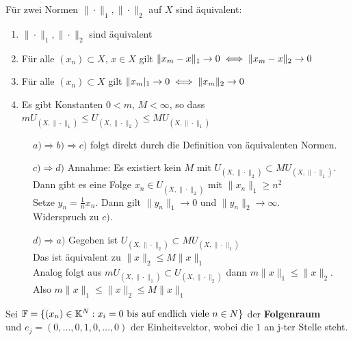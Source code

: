 \begin{prop}
	Für zwei Normen $\| \cdot \|_{1}, \| \cdot \|_{2}$ auf $X$ sind äquivalent:
	\begin{enumerate}[label=\alph*\upshape)]
		\item $\| \cdot \|_{1}, \| \cdot \|_{2}$ sind äquivalent
		\item Für alle $(x_{n}) \subset X$, $x \in X$ gilt $\| x_{m} - x \|_{1} \rightarrow 0 \iff \| x_{m} - x \|_{2} \rightarrow 0 $
		\item Für alle $(x_{n}) \subset X$ gilt $\| x_{m} |_{1} \rightarrow 0 \iff \| x_{m} \|_{2} \rightarrow 0 $
		\item Es gibt Konstanten $0 < m$, $M < \infty$, so dass $m U_{(X, \| \cdot \|_{1})} \leq U_{(X, \| \cdot \|_{2})} \leq M U_{(X, \| \cdot \|_{1})}$
	\end{enumerate}
	\begin{beweis}
		\begin{description}
			\item[] $a) \Rightarrow b) \Rightarrow c)$ folgt direkt durch die Definition von äquivalenten Normen. 
  			\item[] $c) \Rightarrow d)$ Annahme: Es existiert kein $M$ mit $U_{(X, \| \cdot \|_{2})} \subset M U_{(X, \| \cdot \|_{1})}$. \\
  				Dann gibt es eine Folge $x_{n} \in U_{(X, \| \cdot \|_{2})}$ mit $\| x_{n} \|_{1} \geq n^{2}$ \\
  				Setze $y_{n} =  \frac{1}{n} x_{n}$. Dann gilt $\| y_{n} \|_{1} \rightarrow 0$ und $\| y_{n} \|_{2} \rightarrow \infty$. \\
  				Widerspruch zu $c)$.
  			 \item[] $d) \Rightarrow a)$ Gegeben ist $U_{(X, \| \cdot \|_{2})} \subset M U_{(X, \| \cdot \|_{1})}$ \\
  			 Das ist äquivalent zu $\| x \|_{2} \leq M \| x \|_{1}$ \\
  			 Analog folgt aus $m U_{(X, \| \cdot \|_{1})} \subset U_{(X, \| \cdot \|_{2})}$ dann $m \| x \|_{1} \leq \| x \|_{2}$. \\
  			 Also $m \| x \|_{1} \leq \| x \|_{2} \leq M \| x \|_{1}$ 
		\end{description}
	\end{beweis}
\end{prop}


\begin{vereinbarung}
Sei $\mathbb{F} = \{ (x_{n}) \in \mathbb{K}^{N}: x_{i} = 0 \text{ bis auf endlich viele } n \in N  \} $ der \textbf{Folgenraum} \\
und $e_{j} = (0, \dotsc, 0, 1, 0, \dotsc, 0) $ der Einheitsvektor, wobei die $1$ an j-ter Stelle steht.
\end{vereinbarung}

